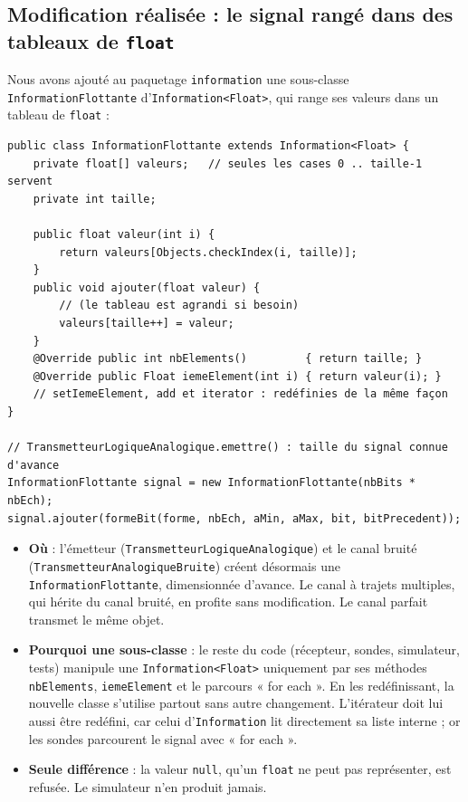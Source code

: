 \documentclass[11pt,a4paper]{article}
\newcommand{\cls}[1]{\texttt{#1}}
\begin{document}
\subsection{Modification réalisée : le signal rangé dans des tableaux de \texttt{float}}
Nous avons ajouté au paquetage \texttt{information} une sous-classe \cls{InformationFlottante} d'\cls{Information<Float>}, qui range ses valeurs dans un tableau de \texttt{float} :
\begin{lstlisting}
public class InformationFlottante extends Information<Float> {
    private float[] valeurs;   // seules les cases 0 .. taille-1 servent
    private int taille;

    public float valeur(int i) {
        return valeurs[Objects.checkIndex(i, taille)];
    }
    public void ajouter(float valeur) {
        // (le tableau est agrandi si besoin)
        valeurs[taille++] = valeur;
    }
    @Override public int nbElements()         { return taille; }
    @Override public Float iemeElement(int i) { return valeur(i); }
    // setIemeElement, add et iterator : redéfinies de la même façon
}

// TransmetteurLogiqueAnalogique.emettre() : taille du signal connue d'avance
InformationFlottante signal = new InformationFlottante(nbBits * nbEch);
signal.ajouter(formeBit(forme, nbEch, aMin, aMax, bit, bitPrecedent));
\end{lstlisting}
\begin{itemize}
  \item \textbf{Où} : l'émetteur (\cls{TransmetteurLogiqueAnalogique}) et le canal bruité (\cls{TransmetteurAnalogiqueBruite}) créent désormais une \cls{InformationFlottante}, dimensionnée d'avance. Le canal à trajets multiples, qui hérite du canal bruité, en profite sans modification. Le canal parfait transmet le même objet.
  \item \textbf{Pourquoi une sous-classe} : le reste du code (récepteur, sondes, simulateur, tests) manipule une \cls{Information<Float>} uniquement par ses méthodes \texttt{nbElements}, \texttt{iemeElement} et le parcours « for each ». En les redéfinissant, la nouvelle classe s'utilise partout sans autre changement. L'itérateur doit lui aussi être redéfini, car celui d'\cls{Information} lit directement sa liste interne ; or les sondes parcourent le signal avec « for each ».
  \item \textbf{Seule différence} : la valeur \texttt{null}, qu'un \texttt{float} ne peut pas représenter, est refusée. Le simulateur n'en produit jamais.
\end{itemize}
\end{document}
